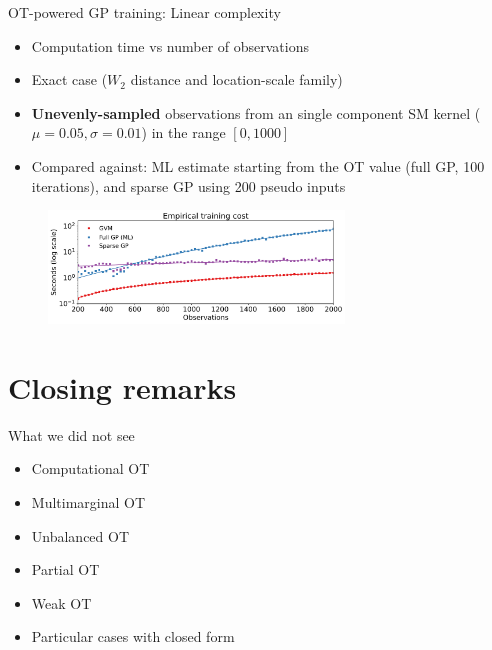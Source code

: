 \documentclass[pdf,aspectratio=169,10pt]{beamer}
\begin{document}
\begin{frame}[plain]{OT-powered GP training: Linear complexity }

\begin{itemize}
    \item Computation time vs number of observations
    \item Exact case ($W_2$ distance and location-scale family)
    \item \textbf{Unevenly-sampled} observations from an single component SM kernel ($\mu=0.05, \sigma=0.01$) in the range $[0,1000]$
    \item Compared against: ML estimate starting from the OT value (full GP, 100 iterations), and sparse GP using 200 pseudo inputs
\end{itemize}

\begin{figure}[ht]
\centering
  \includegraphics[width=0.7\textwidth]{../img/exp2.pdf}
  \label{fig:comp_cost}
\end{figure} 
    
\end{frame}






\section{Closing remarks}

\begin{frame}{What we did not see}
\begin{itemize}
    \item Computational OT
    \item Multimarginal OT
    \item Unbalanced OT
    \item Partial OT
    \item Weak OT
    \item Particular cases with closed form
\end{itemize}
\end{frame}
\end{document}
